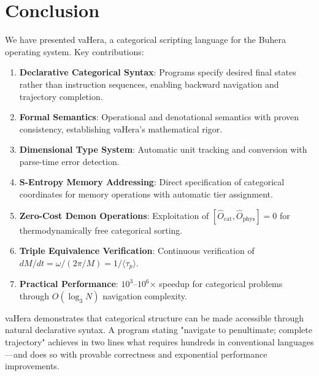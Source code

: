 \documentclass[twocolumn,10pt]{article}
\theoremstyle{definition}
\theoremstyle{remark}
\begin{document}
\section{Conclusion}
\label{sec:conclusion}

We have presented vaHera, a categorical scripting language for the Buhera operating system. Key contributions:

\begin{enumerate}
    \item \textbf{Declarative Categorical Syntax}: Programs specify desired final states rather than instruction sequences, enabling backward navigation and trajectory completion.

    \item \textbf{Formal Semantics}: Operational and denotational semantics with proven consistency, establishing vaHera's mathematical rigor.

    \item \textbf{Dimensional Type System}: Automatic unit tracking and conversion with parse-time error detection.

    \item \textbf{S-Entropy Memory Addressing}: Direct specification of categorical coordinates for memory operations with automatic tier assignment.

    \item \textbf{Zero-Cost Demon Operations}: Exploitation of $[\hat{O}_{\text{cat}}, \hat{O}_{\text{phys}}] = 0$ for thermodynamically free categorical sorting.

    \item \textbf{Triple Equivalence Verification}: Continuous verification of $dM/dt = \omega/(2\pi/M) = 1/\langle\tau_p\rangle$.

    \item \textbf{Practical Performance}: $10^3$--$10^6$× speedup for categorical problems through $O(\log_3 N)$ navigation complexity.
\end{enumerate}

vaHera demonstrates that categorical structure can be made accessible through natural declarative syntax. A program stating "navigate to penultimate; complete trajectory" achieves in two lines what requires hundreds in conventional languages—and does so with provable correctness and exponential performance improvements.
\end{document}
